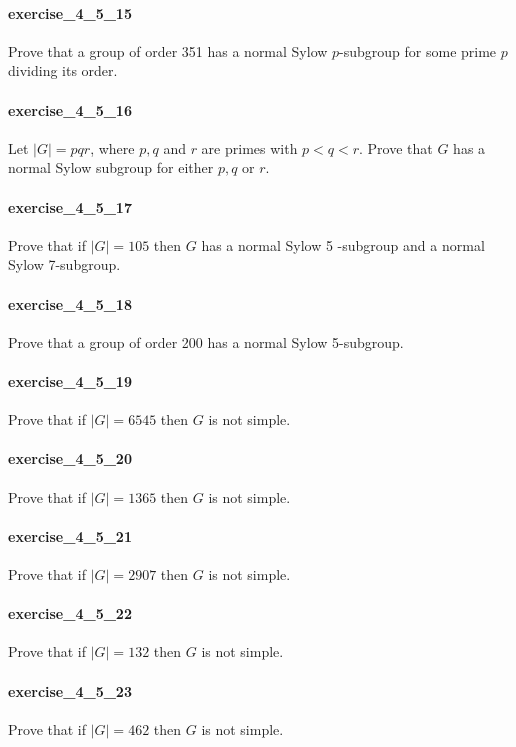 \documentclass{article}
\begin{document}
\paragraph{exercise\_4\_5\_15} Prove that a group of order 351 has a normal Sylow $p$-subgroup for some prime $p$ dividing its order.

\paragraph{exercise\_4\_5\_16} Let $|G|=p q r$, where $p, q$ and $r$ are primes with $p<q<r$. Prove that $G$ has a normal Sylow subgroup for either $p, q$ or $r$.

\paragraph{exercise\_4\_5\_17} Prove that if $|G|=105$ then $G$ has a normal Sylow 5 -subgroup and a normal Sylow 7-subgroup.

\paragraph{exercise\_4\_5\_18} Prove that a group of order 200 has a normal Sylow 5-subgroup.

\paragraph{exercise\_4\_5\_19} Prove that if $|G|=6545$ then $G$ is not simple.

\paragraph{exercise\_4\_5\_20} Prove that if $|G|=1365$ then $G$ is not simple.

\paragraph{exercise\_4\_5\_21} Prove that if $|G|=2907$ then $G$ is not simple.

\paragraph{exercise\_4\_5\_22} Prove that if $|G|=132$ then $G$ is not simple.

\paragraph{exercise\_4\_5\_23} Prove that if $|G|=462$ then $G$ is not simple.
\end{document}
